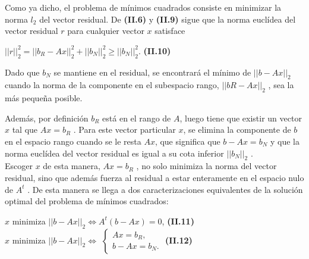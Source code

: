 \documentclass[twocolumn,twoside]{article}
\begin{document}
Como ya dicho, el problema de m\'inimos cuadrados consiste en minimizar la norma $l_2$ del
vector residual. De \textbf{(II.6) }y \textbf{(II.9)} sigue que la norma eucl\'idea del vector 
residual $r$ para cualquier vector $x$ satisface
\begin{center}
  $||r||_2^2 = ||b_R - A x||_2^2 + ||b_N ||_2^2\geq ||b_N ||_2^2$. \textbf{(II.10)}
\end{center}

Dado que $b_N$ se mantiene en el residual, se encontrar\'a el m\'inimo de $||b - A x||_2$ cuando
la norma de la componente en el subespacio rango, $||b R - A x||_2$ , sea la m\'as peque\~na posible.
             
Adem\'as, por definici\'on $b_R$ est\'a en el rango de $A$, luego tiene que existir un
vector $x$ tal que $A x = b_R$ . Para este vector particular $x$, se elimina la componente de
$b$ en el espacio rango cuando se le resta $A x$, que significa que $b - A x = b_N$ y que la
norma eucl\'idea del vector residual es igual a su cota inferior $||b_N ||_2$ .\\
Escoger $x$ de esta manera, $A x = b_R$ , no solo minimiza la norma del vector residual,
sino que adem\'as fuerza al residual a estar enteramente en el espacio nulo de $A^t$ . De esta
manera se llega a dos caracterizaciones equivalentes de la soluci\'on optimal del problema
de m\'inimos cuadrados:
\begin{center}
  $x$ minimiza $||b - A x||_2 \Longleftrightarrow A^t (b - A x) = 0$, \textbf{(II.11)}\\
  $x$ minimiza $||b - A x||_2 \Longleftrightarrow$
  $\left \{ \begin{matrix} A x = b_R ,\\ 
  b - Ax = b_N .\end{matrix}\right.$ \textbf{(II.12)}
\end{center}
\end{document}
